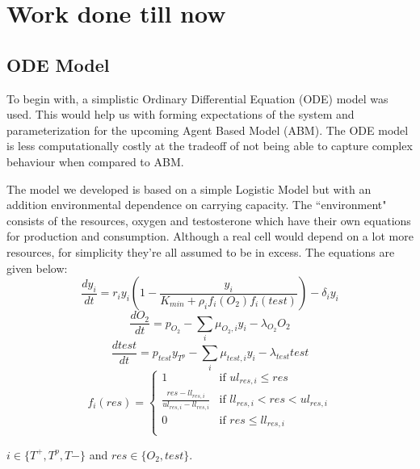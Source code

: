 \documentclass[11pt,a4paper]{article}
\begin{document}
\section{Work done till now}
\subsection{ODE Model}
To begin with, a simplistic Ordinary Differential Equation (ODE) model was used. This would help us with forming expectations of the system and parameterization for the upcoming Agent Based Model (ABM). The ODE model is less computationally costly at the tradeoff of not being able to capture complex behaviour when compared to ABM.

The model we developed is based on a simple Logistic Model \cite{Logistic} but with an addition environmental dependence on carrying capacity. The ``environment" consists of the resources, oxygen and testosterone which have their own equations for production and consumption. Although a real cell would depend on a lot more resources, for simplicity they're all assumed to be in excess. The equations are given below:
\begin{equation}
  \frac{dy_i}{dt} = r_i y_i (1 - \frac{y_i}{K_{min} + \rho_i f_i(O_2) f_i(test)} )- \delta_i y_i
  \label{celleq}
\end{equation}
\begin{equation}
  \frac{dO_2}{dt} = p_{O_2} - \sum_i \mu_{O_2,i} y_i - \lambda_{O_2} O_2
  \label{o2eq}
\end{equation}
\begin{equation}
  \frac{dtest}{dt} = p_{test} y_{T^p} - \sum_i \mu_{test,i} y_i - \lambda_{test} test
  \label{testeq}
\end{equation}
\begin{equation}
  f_i(res) = \begin{cases}
    1 &\text{if } ul_{res,i} \leq res\\
    \frac{res-ll_{res,i}}{ul_{res,i}-ll_{res,i}} &\text{if } ll_{res,i} < res < ul_{res,i}\\
    0 &\text{if } res \leq ll_{res,i}\\
  \end{cases}
  \label{freseq}
\end{equation}

$i \in \{T^+,T^p,T-\}$ and $res \in \{O_2,test\}$.
\end{document}
